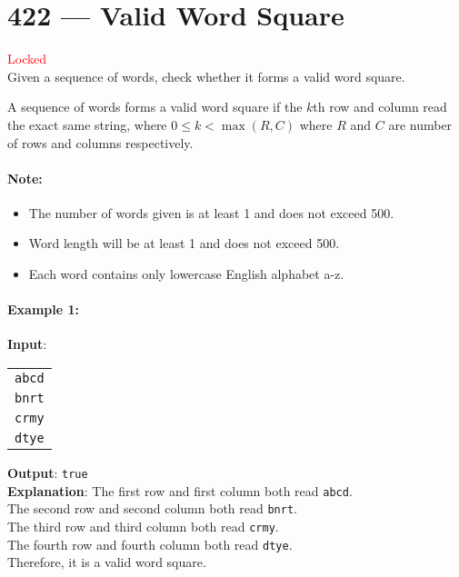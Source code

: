 \section{422 --- Valid Word Square}
\textcolor{red}{Locked}
\\
Given a sequence of words, check whether it forms a valid word square.
\par
A sequence of words forms a valid word square if the $ k $th row and column read the exact same string, where $0 \leq k < \max(R, C)$ where $R$ and $C$ are number of rows and columns respectively.

\paragraph{Note:}

\begin{itemize}
\item The number of words given is at least 1 and does not exceed 500.
\item Word length will be at least 1 and does not exceed 500.
\item  Each word contains only lowercase English alphabet a-z.
\end{itemize}


\paragraph{Example 1:}

\begin{flushleft}
\textbf{Input}:
\begin{table}[H]
\begin{tabular}{l}
\texttt{abcd} \\
\texttt{bnrt} \\
\texttt{crmy} \\
\texttt{dtye}
\end{tabular}
\end{table}
\textbf{Output}: \texttt{true}
\\
\textbf{Explanation}:
The first row and first column both read \texttt{abcd}.
\\
The second row and second column both read \texttt{bnrt}.
\\
The third row and third column both read \texttt{crmy}.
\\
The fourth row and fourth column both read \texttt{dtye}.
\\
Therefore, it is a valid word square.
\end{flushleft}

